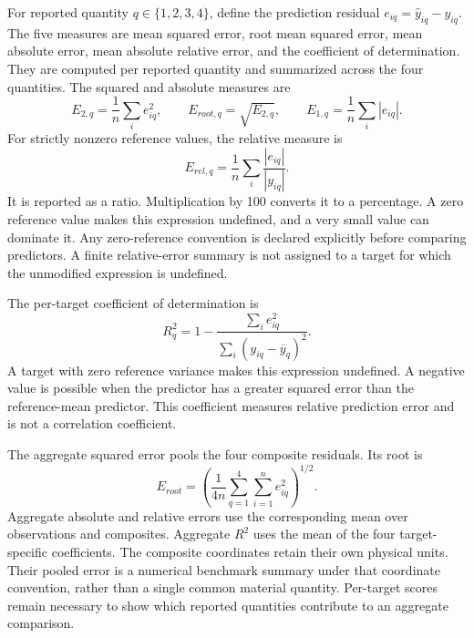 For reported quantity \(q\in\{1,2,3,4\}\), define the prediction residual \(e_{iq}=\widehat y_{iq}-y_{iq}\). The five measures are mean squared error, root mean squared error, mean absolute error, mean absolute relative error, and the coefficient of determination. They are computed per reported quantity and summarized across the four quantities. The squared and absolute measures are
\begin{equation}
\label{eq:icsor_composite_error_metrics}
E_{2,q}=\frac{1}{n}\sum_i e_{iq}^{2},
\qquad E_{root,q}=\sqrt{E_{2,q}},
\qquad E_{1,q}=\frac{1}{n}\sum_i|e_{iq}|.
\end{equation}
For strictly nonzero reference values, the relative measure is
\begin{equation}
\label{eq:icsor_relative_error}
E_{rel,q}=\frac{1}{n}\sum_i\frac{|e_{iq}|}{|y_{iq}|}.
\end{equation}
It is reported as a ratio. Multiplication by 100 converts it to a percentage. A zero reference value makes this expression undefined, and a very small value can dominate it. Any zero-reference convention is declared explicitly before comparing predictors. A finite relative-error summary is not assigned to a target for which the unmodified expression is undefined.

The per-target coefficient of determination is
\begin{equation}
\label{eq:icsor_coefficient_determination}
R_q^2=1-
\frac{\sum_i e_{iq}^{2}}
{\sum_i(y_{iq}-\overline y_q)^2}.
\end{equation}
A target with zero reference variance makes this expression undefined. A negative value is possible when the predictor has a greater squared error than the reference-mean predictor. This coefficient measures relative prediction error and is not a correlation coefficient.

The aggregate squared error pools the four composite residuals. Its root is
\begin{equation}
\label{eq:icsor_aggregate_root_error}
E_{root}=\left(\frac{1}{4n}\sum_{q=1}^{4}\sum_{i=1}^{n}e_{iq}^{2}\right)^{1/2}.
\end{equation}
Aggregate absolute and relative errors use the corresponding mean over observations and composites. Aggregate \(R^2\) uses the mean of the four target-specific coefficients. The composite coordinates retain their own physical units. Their pooled error is a numerical benchmark summary under that coordinate convention, rather than a single common material quantity. Per-target scores remain necessary to show which reported quantities contribute to an aggregate comparison.

